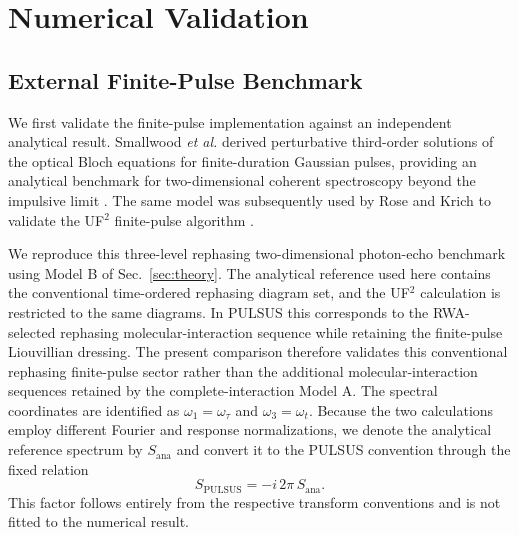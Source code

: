 \section{Numerical Validation}
\label{sec:validation}

\subsection{External Finite-Pulse Benchmark}
\label{sec:validation_smallwood}

We first validate the finite-pulse implementation against an
independent analytical result.
Smallwood \textit{et al.} derived perturbative third-order solutions of
the optical Bloch equations for finite-duration Gaussian pulses,
providing an analytical benchmark for two-dimensional coherent
spectroscopy beyond the impulsive limit
\cite{Smallwood2017FinitePulse}.
The same model was subsequently used by Rose and Krich to validate the
UF$^2$ finite-pulse algorithm
\cite{RoseKrich2021UF2}.

We reproduce this three-level rephasing two-dimensional photon-echo
benchmark using Model B of Sec.~\ref{sec:theory}. The analytical
reference used here contains the conventional time-ordered rephasing
diagram set, and the UF$^2$ calculation is restricted to the same
diagrams. In PULSUS this corresponds to the RWA-selected rephasing
molecular-interaction sequence while retaining the finite-pulse
Liouvillian dressing.
The present comparison therefore validates this conventional
rephasing finite-pulse sector rather than the additional
molecular-interaction sequences retained by the complete-interaction
Model A.
The spectral coordinates are identified as
$\omega_1=\omega_\tau$ and $\omega_3=\omega_t$.
Because the two calculations employ different Fourier and response
normalizations, we denote the analytical reference spectrum by
$S_{\mathrm{ana}}$ and convert it to the PULSUS convention through
the fixed relation
%
\begin{equation}
S_{\mathrm{PULSUS}}
=
-i\,2\pi\,S_{\mathrm{ana}} .
\label{eq:smallwood_conversion}
\end{equation}
%
This factor follows entirely from the respective transform conventions
and is not fitted to the numerical result.


